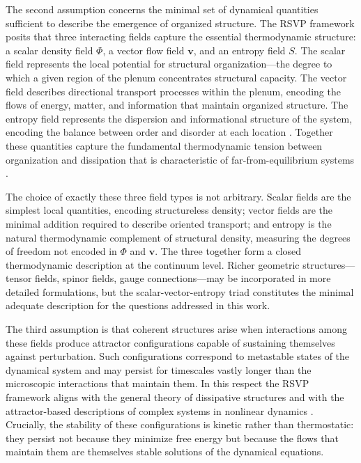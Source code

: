 \documentclass[12pt]{article}
\begin{document}
The second assumption concerns the minimal set of dynamical quantities sufficient to describe the emergence of organized structure. The RSVP framework posits that three interacting fields capture the essential thermodynamic structure: a scalar density field $\Phi$, a vector flow field $\mathbf{v}$, and an entropy field $S$. The scalar field represents the local potential for structural organization---the degree to which a given region of the plenum concentrates structural capacity. The vector field describes directional transport processes within the plenum, encoding the flows of energy, matter, and information that maintain organized structure. The entropy field represents the dispersion and informational structure of the system, encoding the balance between order and disorder at each location \cite{jaynes1957,cover2006}. Together these quantities capture the fundamental thermodynamic tension between organization and dissipation that is characteristic of far-from-equilibrium systems \cite{prigogine1984,nicolis1977}.

The choice of exactly these three field types is not arbitrary. Scalar fields are the simplest local quantities, encoding structureless density; vector fields are the minimal addition required to describe oriented transport; and entropy is the natural thermodynamic complement of structural density, measuring the degrees of freedom not encoded in $\Phi$ and $\mathbf{v}$. The three together form a closed thermodynamic description at the continuum level. Richer geometric structures---tensor fields, spinor fields, gauge connections---may be incorporated in more detailed formulations, but the scalar-vector-entropy triad constitutes the minimal adequate description for the questions addressed in this work.

The third assumption is that coherent structures arise when interactions among these fields produce attractor configurations capable of sustaining themselves against perturbation. Such configurations correspond to metastable states of the dynamical system and may persist for timescales vastly longer than the microscopic interactions that maintain them. In this respect the RSVP framework aligns with the general theory of dissipative structures \cite{prigogine1984} and with the attractor-based descriptions of complex systems in nonlinear dynamics \cite{strogatz1994}. Crucially, the stability of these configurations is kinetic rather than thermostatic: they persist not because they minimize free energy but because the flows that maintain them are themselves stable solutions of the dynamical equations.
\end{document}
